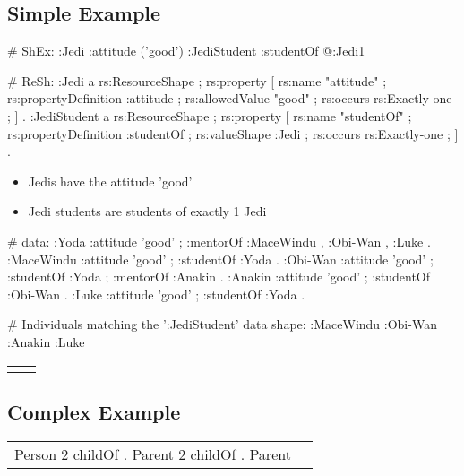 \documentclass{llncs}
\newenvironment{DL}{
\vspace{0cm}
	\begin{center}
  \begin{tabular}{r l}

}{
  \end{tabular}
	\end{center}
}
\begin{document}
\subsection{Simple Example}


\begin{ex}
# ShEx:
:Jedi {
    :attitude ('good') }
:JediStudent {
    :studentOf @:Jedi{1} }
\end{ex}

\begin{ex}
# ReSh:
:Jedi a rs:ResourceShape ;
    rs:property [
        rs:name "attitude" ;
        rs:propertyDefinition :attitude ;
        rs:allowedValue "good" ;
        rs:occurs rs:Exactly-one ;
    ] .
:JediStudent a rs:ResourceShape ;
    rs:property [
        rs:name "studentOf" ;
        rs:propertyDefinition :studentOf ;
        rs:valueShape :Jedi ;
        rs:occurs rs:Exactly-one ;
    ] .
\end{ex}

\begin{itemize}
	\item Jedis have the attitude 'good'
	\item Jedi students are students of exactly 1 Jedi
\end{itemize}

\begin{ex}
# data:
:Yoda 
    :attitude 'good' ;
    :mentorOf :MaceWindu , :Obi-Wan , :Luke .
:MaceWindu
    :attitude 'good' ;
    :studentOf :Yoda .
:Obi-Wan 
    :attitude 'good' ;
    :studentOf :Yoda ;
    :mentorOf :Anakin .
:Anakin
    :attitude 'good' ; 
    :studentOf :Obi-Wan .
:Luke
    :attitude 'good' ;
    :studentOf :Yoda .
\end{ex}

\begin{ex}
# Individuals matching the ’:JediStudent’ data shape:
:MaceWindu :Obi-Wan :Anakin :Luke
\end{ex}

\begin{DL}
\\
 \\
\end{DL}

\subsection{Complex Example}

\begin{DL}
Person   2 childOf . Parent    2 childOf . Parent \\
\end{DL}
\end{document}
